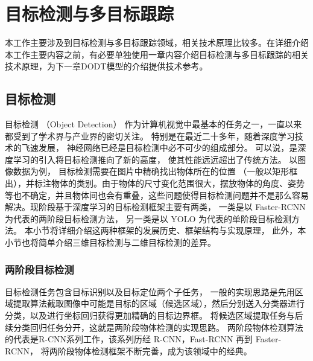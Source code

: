 \chapter{目标检测与多目标跟踪}
\label{technologies}
本工作主要涉及到目标检测与多目标跟踪领域，相关技术原理比较多。在详细介绍本工作主要内容之前，有必要单独使用一章内容介绍目标检测与多目标跟踪的相关技术原理，为下一章DODT模型的介绍提供技术参考。

\section{目标检测}
\label{object_detection}
目标检测 （Object Detection） 作为计算机视觉中最基本的任务之一，一直以来都受到了学术界与产业界的密切关注。 特别是在最近二十多年，随着深度学习技术的飞速发展， 神经网络已经是目标检测中必不可少的组成部分。 可以说，是深度学习的引入将目标检测推向了新的高度， 使其性能远远超出了传统方法。 以图像数据为例， 目标检测需要在图片中精确找出物体所在的位置 （一般以矩形框出），并标注物体的类别。由于物体的尺寸变化范围很大，摆放物体的角度、姿势等也不确定，并且物体间也会有重叠，这些问题使得目标检测问题并不是那么容易解决。现阶段基于深度学习的目标检测框架主要有两类， 一类是以 Faster-RCNN\cite{ren2015faster} 为代表的两阶段目标检测方法， 另一类是以 YOLO\cite{redmon2016you} 为代表的单阶段目标检测方法。 本小节将详细介绍这两种框架的发展历史、框架结构与实现原理， 此外，本小节也将简单介绍三维目标检测与二维目标检测的差异。

\subsection{两阶段目标检测}
\label{two-stage}
目标检测任务包含目标识别以及目标定位两个子任务， 一般的实现思路是先用区域提取算法截取图像中可能是目标的区域（候选区域），然后分别送入分类器进行分类，以及进行坐标回归获得更加精确的目标边界框。 将候选区域提取任务与后续分类回归任务分开，这就是两阶段物体检测的实现思路。 两阶段物体检测算法的代表是R-CNN系列工作，该系列历经 R-CNN\cite{6909475}，Fast-RCNN\cite{girshick2015fast} 再到 Faster-RCNN\cite{ren2015faster}， 将两阶段物体检测框架不断完善，成为该领域中的经典。 

